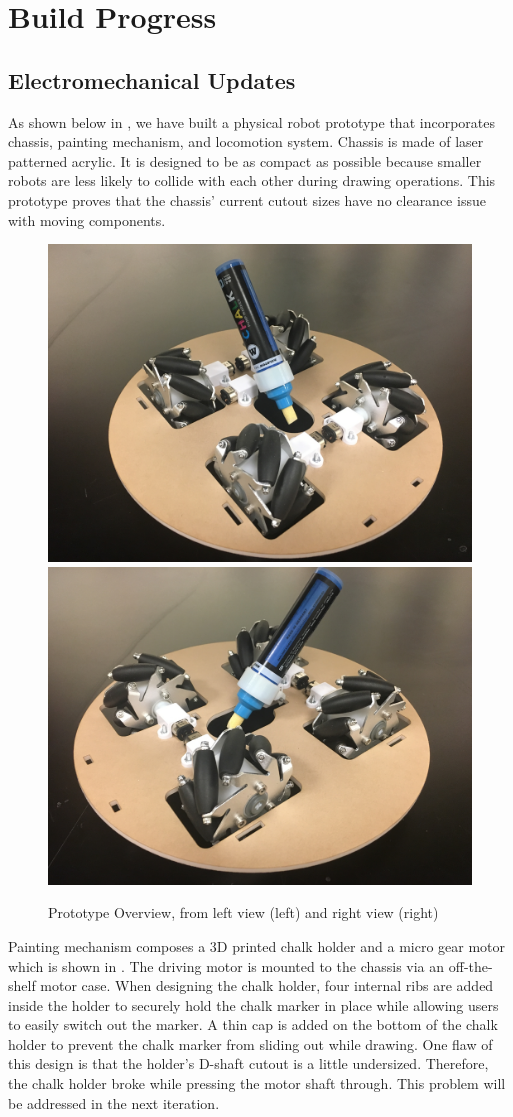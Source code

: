 
\section{Build Progress}
\label{sec:build_progress}


\subsection{Electromechanical Updates}
\label{sec:electromechanical_progress}
As shown below in , we have built a physical robot prototype that incorporates chassis, painting mechanism, and locomotion system. Chassis is made of laser patterned acrylic. It is designed to be as compact as possible because smaller robots are less likely to collide with each other during drawing operations. This prototype proves that the chassis’ current cutout sizes have no clearance issue with moving components. 

\begin{figure}[h!]
\centering
\includegraphics[width=0.49\columnwidth]{CAD/full_system_1.jpeg}
\includegraphics[width=0.49\columnwidth]{CAD/full_system_2.jpeg}
\label{fig:em1}
\caption{Prototype Overview, from left view (left) and right view (right)}
\end{figure}

Painting mechanism composes a 3D printed chalk holder and a micro gear motor which is shown in . The driving motor is mounted to the chassis via an off-the-shelf motor case. When designing the chalk holder, four internal ribs are added inside the holder to securely hold the chalk marker in place while allowing users to easily switch out the marker. A thin cap is added on the bottom of the chalk holder to prevent the chalk marker from sliding out while drawing. One flaw of this design is that the holder’s D-shaft cutout is a little undersized. Therefore, the chalk holder broke while pressing the motor shaft through. This problem will be addressed in the next iteration. 

